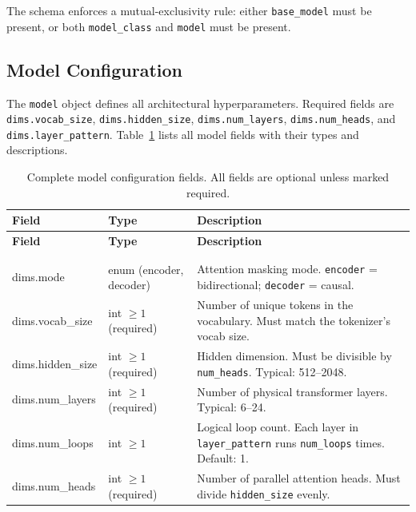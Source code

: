 The schema enforces a mutual-exclusivity rule: either \texttt{base\_model} must be present, or both \texttt{model\_class} and \texttt{model} must be present.

\subsection{Model Configuration}
\label{subsec:model-config}

The \texttt{model} object defines all architectural hyperparameters. Required fields are \texttt{dims.vocab\_size}, \texttt{dims.hidden\_size}, \texttt{dims.num\_layers}, \texttt{dims.num\_heads}, and \texttt{dims.layer\_pattern}. Table~\ref{tab:model-fields} lists all model fields with their types and descriptions.

\begin{longtable}{>{\ttfamily\footnotesize\raggedright\arraybackslash}p{5.6cm}>{\raggedright\arraybackslash}p{2.4cm}>{\raggedright\arraybackslash}p{6.9cm}}
\toprule
\textbf{Field} & \textbf{Type} & \textbf{Description} \\
\midrule
\endfirsthead
\toprule
\textbf{Field} & \textbf{Type} & \textbf{Description} \\
\midrule
\endhead
\midrule
\multicolumn{3}{r}{\textit{continued on next page}} \\
\endfoot
\bottomrule
\caption{Complete model configuration fields. All fields are optional unless marked required.}
\label{tab:model-fields}
\endlastfoot
\midrule
\multicolumn{3}{l}{\textit{model.dims.*}} \\
\midrule
dims.mode & enum (encoder, decoder) & Attention masking mode. \texttt{encoder} = bidirectional; \texttt{decoder} = causal. \\
dims.vocab\_size & int $\ge 1$ (required) & Number of unique tokens in the vocabulary. Must match the tokenizer's vocab size. \\
dims.hidden\_size & int $\ge 1$ (required) & Hidden dimension. Must be divisible by \texttt{num\_heads}. Typical: 512--2048. \\
dims.num\_layers & int $\ge 1$ (required) & Number of physical transformer layers. Typical: 6--24. \\
dims.num\_loops & int $\ge 1$ & Logical loop count. Each layer in \texttt{layer\_pattern} runs \texttt{num\_loops} times. Default: 1. \\
dims.num\_heads & int $\ge 1$ (required) & Number of parallel attention heads. Must divide \texttt{hidden\_size} evenly. \\

\end{longtable}

